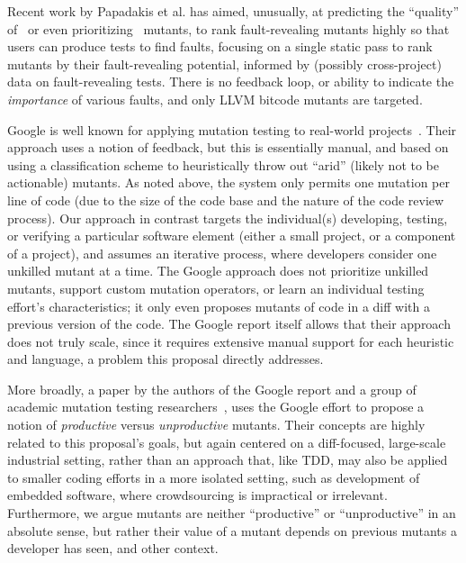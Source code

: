 Recent work by Papadakis et al. has
aimed, unusually, at predicting the ``quality'' of~\cite{MutQuality}
or even prioritizing~\cite{FaRM} mutants, to rank fault-revealing
mutants highly so that users can produce tests to find faults, focusing on a single static
pass to rank mutants by their fault-revealing potential, informed by
(possibly cross-project)
data on fault-revealing tests.  There is no feedback loop, or ability
to indicate the \emph{importance} of various faults, and only LLVM
bitcode mutants are targeted.  %

Google is well known for applying mutation
testing to real-world projects~\cite{MutGoogle}.  Their approach 
uses a notion of feedback, but this is  essentially manual, and based on
using a classification scheme to heuristically throw out ``arid''
(likely not to be actionable)
mutants. As noted above, the system only permits one mutation per line of code
(due to the size of the code base and the nature of the code review process). 
Our approach in contrast targets the individual(s) developing, testing, or verifying a particular software
element (either a small project, or a component of a project), and
assumes an iterative process, where developers consider one unkilled
mutant at a time.  The Google approach does not prioritize
unkilled mutants, support custom mutation
operators, or learn an individual testing effort's characteristics; it only even
proposes mutants of code in a diff with a previous version of the
code.  
The Google report
itself allows that their approach does not truly scale, since it
requires extensive manual support for each heuristic and language, a
problem this proposal directly addresses.

More broadly, a paper by the
authors of the Google report and a group of academic mutation testing
researchers~\cite{ivankovic2018industrial}, uses the Google effort to
propose a notion of \emph{productive} versus \emph{unproductive} mutants.  Their
concepts are highly related to this proposal's goals, but again centered on a
diff-focused, large-scale industrial setting, rather than an approach
that, like TDD, may also be applied to smaller coding efforts in a more
isolated setting, such as development of embedded software, where
crowdsourcing is impractical or irrelevant.  
Furthermore, we argue mutants
are neither ``productive'' or ``unproductive'' in an absolute sense, but
rather their value of a mutant depends on previous mutants a
developer has seen, and other context.




